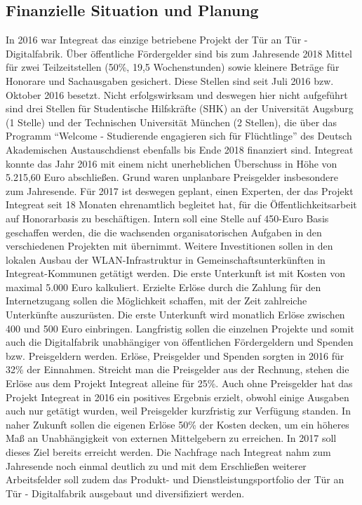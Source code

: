 \documentclass[12pt, a4paper]{article} %
\begin{document}
\subsection{Finanzielle Situation und Planung}
In 2016 war Integreat das einzige betriebene Projekt der Tür an Tür - Digitalfabrik. Über öffentliche Fördergelder sind bis zum Jahresende 2018 Mittel für zwei Teilzeitstellen (50\%, 19,5 Wochenstunden) sowie kleinere Beträge für Honorare und Sachausgaben gesichert. Diese Stellen sind seit Juli 2016 bzw. Oktober 2016 besetzt. Nicht erfolgswirksam und deswegen hier nicht aufgeführt sind drei Stellen für Studentische Hilfskräfte (SHK) an der Universität Augsburg (1 Stelle) und der Technischen Universität München (2 Stellen), die über das Programm “Welcome - Studierende engagieren sich für Flüchtlinge” des Deutsch Akademischen Austauschdienst ebenfalls bis Ende 2018 finanziert sind. 
Integreat konnte das Jahr 2016 mit einem nicht unerheblichen Überschuss in Höhe von 5.215,60 Euro abschließen. Grund waren  unplanbare Preisgelder insbesondere zum Jahresende. 
Für 2017 ist deswegen geplant, einen Experten, der das Projekt Integreat seit 18 Monaten ehrenamtlich begleitet hat, für die Öffentlichkeitsarbeit auf Honorarbasis zu beschäftigen. 
Intern soll eine Stelle auf 450-Euro Basis geschaffen werden, die die wachsenden organisatorischen Aufgaben in den verschiedenen Projekten mit übernimmt. 
Weitere Investitionen sollen in den lokalen Ausbau der WLAN-Infrastruktur in Gemeinschaftsunterkünften in Integreat-Kommunen getätigt werden. Die erste Unterkunft ist mit Kosten von maximal 5.000 Euro kalkuliert. Erzielte Erlöse durch die Zahlung für den Internetzugang sollen die Möglichkeit schaffen, mit der Zeit zahlreiche Unterkünfte auszurüsten. Die erste Unterkunft wird monatlich Erlöse zwischen 400 und 500 Euro einbringen. 
Langfristig sollen die einzelnen Projekte und somit auch die Digitalfabrik unabhängiger von öffentlichen Fördergeldern und Spenden bzw. Preisgeldern werden. Erlöse, Preisgelder und Spenden sorgten in 2016 für 32\% der Einnahmen. Streicht man die Preisgelder aus der Rechnung, stehen die Erlöse aus dem Projekt Integreat alleine für 25\%. Auch ohne Preisgelder hat das Projekt Integreat in 2016 ein positives Ergebnis erzielt, obwohl einige Ausgaben auch nur getätigt wurden, weil Preisgelder kurzfristig zur Verfügung standen. 
In naher Zukunft sollen die eigenen Erlöse 50\% der Kosten decken, um ein höheres Maß an Unabhängigkeit von externen Mittelgebern zu erreichen. In 2017 soll dieses Ziel bereits erreicht werden. Die Nachfrage nach Integreat nahm zum Jahresende noch einmal deutlich zu und mit dem Erschließen weiterer Arbeitsfelder soll zudem das Produkt- und Dienstleistungsportfolio der Tür an Tür - Digitalfabrik ausgebaut und diversifiziert werden.
\end{document}
